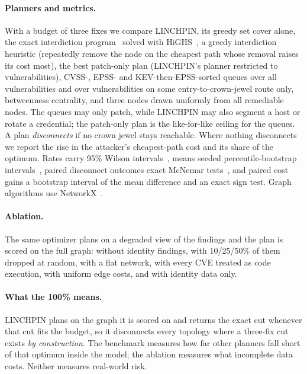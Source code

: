 \documentclass[11pt]{article}
\begin{document}
\paragraph{Planners and metrics.} With a budget of three fixes we compare LINCHPIN, its greedy set cover alone, the
exact interdiction program~\cite{israeli2002shortest} solved with HiGHS~\cite{huangfu2018highs}, a greedy interdiction
heuristic (repeatedly remove the node on the cheapest path whose removal raises its cost most), the best patch-only
plan (LINCHPIN's planner restricted to vulnerabilities), CVSS-, EPSS- and KEV-then-EPSS-sorted queues over all
vulnerabilities and over vulnerabilities on some entry-to-crown-jewel route only, betweenness centrality, and three
nodes drawn uniformly from all remediable nodes. The queues may only patch, while LINCHPIN may also segment a host or
rotate a credential; the patch-only plan is the like-for-like ceiling for the queues. A plan \emph{disconnects} if no
crown jewel stays reachable. Where nothing disconnects we report the rise in the attacker's cheapest-path cost and its
share of the optimum. Rates carry 95\% Wilson intervals~\cite{wilson1927probable}, means seeded percentile-bootstrap
intervals~\cite{efron1979bootstrap}, paired disconnect outcomes exact McNemar tests~\cite{mcnemar1947note}, and paired
cost gains a bootstrap interval of the mean difference and an exact sign test. Graph algorithms use
NetworkX~\cite{hagberg2008networkx}.

\paragraph{Ablation.} The same optimizer plans on a degraded view of the findings and the plan is scored on the full
graph: without identity findings, with 10/25/50\% of them dropped at random, with a flat network, with every CVE
treated as code execution, with uniform edge costs, and with identity data only.

\paragraph{What the 100\% means.} LINCHPIN plans on the graph it is scored on and returns the exact cut whenever that
cut fits the budget, so it disconnects every topology where a three-fix cut exists \emph{by construction}. The
benchmark measures how far other planners fall short of that optimum inside the model; the ablation measures what
incomplete data costs. Neither measures real-world risk.
\end{document}
